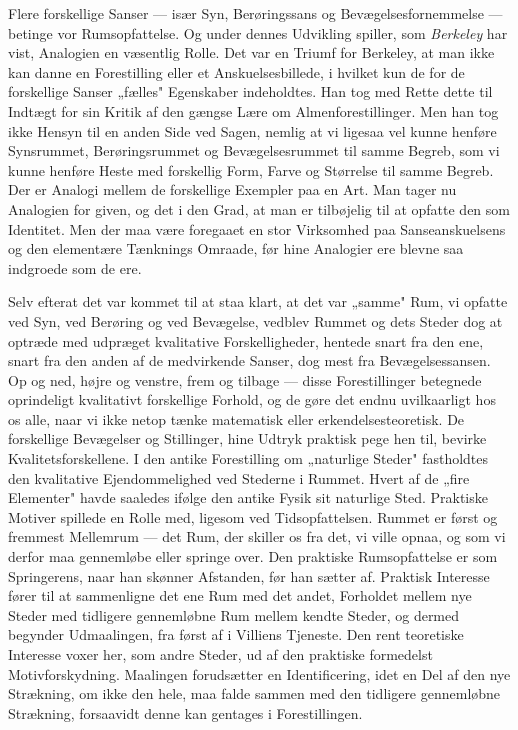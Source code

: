 \documentclass[12pt,a4paper]{book}
\newcommand{\apage}[1]{\marginnote{\footnotesize\textit{[#1]}}}
\begin{document}
Flere forskellige Sanser --- især Syn, Berøringssans og
Bevægelsesfornemmelse --- betinge vor Rumsopfattelse. Og under dennes
Udvikling spiller, som \emph{Berkeley} har vist, Analogien en væsentlig
Rolle. Det var en Triumf for Berkeley, at man ikke kan danne en
Forestilling eller et Anskuelsesbillede, i hvilket kun de for de
forskellige Sanser „fælles" Egenskaber indeholdtes. Han tog med Rette
dette til Indtægt for sin Kritik af den gængse Lære om
Almenforestillinger. Men han tog ikke Hensyn til en anden Side ved
Sagen, nemlig at vi ligesaa vel kunne henføre Synsrummet, Berøringsrummet
og Bevægelsesrummet til samme Begreb, som vi kunne henføre Heste med
forskellig Form, Farve og Størrelse til samme Begreb. Der er Analogi
mellem de forskellige Exempler paa en Art. Man tager nu Analogien for
given, og det i den Grad, at man er tilbøjelig til at opfatte den som
Identitet. Men der maa være foregaaet en stor Virksomhed paa
Sanseanskuelsens og den elementære Tænknings Omraade, før hine Analogier
ere blevne saa indgroede som de ere.

Selv efterat det var kommet til at staa klart, at det var „samme" Rum,
vi opfatte ved Syn, ved Berøring og ved Bevægelse, vedblev Rummet og
dets Steder dog at optræde med udpræget kvalitative Forskelligheder,
hentede snart fra \apage{198} den ene, snart fra den anden af de medvirkende Sanser,
dog mest fra Bevægelsessansen. Op og ned, højre og venstre, frem og
tilbage --- disse Forestillinger betegnede oprindeligt kvalitativt
forskellige Forhold, og de gøre det endnu uvilkaarligt hos os alle, naar
vi ikke netop tænke matematisk eller erkendelsesteoretisk. De
forskellige Bevægelser og Stillinger, hine Udtryk praktisk pege hen til,
bevirke Kvalitetsforskellene. I den antike Forestilling om „naturlige
Steder" fastholdtes den kvalitative Ejendommelighed ved Stederne i
Rummet. Hvert af de „fire Elementer" havde saaledes ifølge den antike
Fysik sit naturlige Sted. Praktiske Motiver spillede en Rolle med,
ligesom ved Tidsopfattelsen. Rummet er først og fremmest Mellemrum ---
det Rum, der skiller os fra det, vi ville opnaa, og som vi derfor maa
gennemløbe eller springe over. Den praktiske Rumsopfattelse er som
Springerens, naar han skønner Afstanden, før han sætter af. Praktisk
Interesse fører til at sammenligne det ene Rum med det andet, Forholdet
mellem nye Steder med tidligere gennemløbne Rum mellem kendte Steder, og
dermed begynder Udmaalingen, fra først af i Villiens Tjeneste. Den rent
teoretiske Interesse voxer her, som andre Steder, ud af den praktiske
formedelst Motivforskydning. Maalingen forudsætter en Identificering,
idet en Del af den nye Strækning, om ikke den hele, maa falde sammen med
den tidligere gennemløbne Strækning, forsaavidt denne kan gentages i
Forestillingen.
\end{document}

